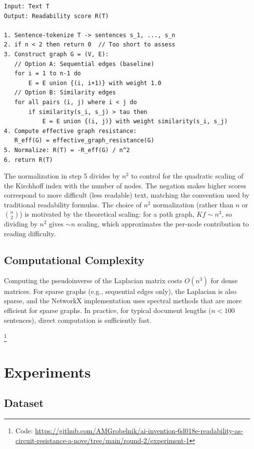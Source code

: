 \documentclass[11pt,letterpaper]{article}
\begin{document}
\begin{lstlisting}[caption={Effective Resistance Readability Scoring}, label={alg:er}, basicstyle=\small\ttfamily, frame=single]
Input: Text T
Output: Readability score R(T)

1. Sentence-tokenize T -> sentences s_1, ..., s_n
2. if n < 2 then return 0  // Too short to assess
3. Construct graph G = (V, E):
   // Option A: Sequential edges (baseline)
   for i = 1 to n-1 do
       E = E union {(i, i+1)} with weight 1.0
   // Option B: Similarity edges
   for all pairs (i, j) where i < j do
       if similarity(s_i, s_j) > tau then
           E = E union {(i, j)} with weight similarity(s_i, s_j)
4. Compute effective graph resistance:
   R_eff(G) = effective_graph_resistance(G)
5. Normalize: R(T) = -R_eff(G) / n^2
6. return R(T)
\end{lstlisting}

The normalization in step 5 divides by $n^2$ to control for the quadratic scaling of the Kirchhoff index with the number of nodes. The negation makes higher scores correspond to more difficult (less readable) text, matching the convention used by traditional readability formulas. The choice of $n^2$ normalization (rather than $n$ or $\binom{n}{2}$) is motivated by the theoretical scaling: for a path graph, $Kf \sim n^3$, so dividing by $n^2$ gives $\sim n$ scaling, which approximates the per-node contribution to reading difficulty.

\subsection{Computational Complexity}

Computing the pseudoinverse of the Laplacian matrix costs $O(n^3)$ for dense matrices. For sparse graphs (e.g., sequential edges only), the Laplacian is also sparse, and the NetworkX implementation uses spectral methods that are more efficient for sparse graphs. In practice, for typical document lengths ($n < 100$ sentences), direct computation is sufficiently fast.

\footnote{Code: \url{https://github.com/AMGrobelnik/ai-invention-6d018e-readability-as-circuit-resistance-a-nove/tree/main/round-2/experiment-1}}

\section{Experiments}
\label{sec:results}

\subsection{Dataset}
\end{document}

